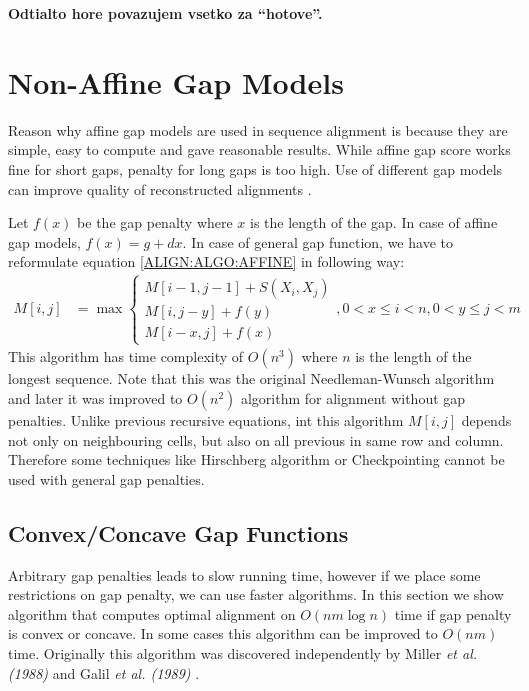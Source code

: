 \bigskip
{\large\bf Odtialto hore povazujem vsetko za ``hotove''. }
\bigskip



\section{Non-Affine Gap Models} 

 Reason why affine gap models are
used in sequence alignment is because they are simple, easy to compute and gave
reasonable results. While affine gap score works fine for short gaps, penalty
for long gaps is too high. Use of different gap models can improve quality of
reconstructed alignments \cite{Gill2004,Cartwright2009}.

Let $f(x)$ be the gap penalty where $x$ is the length of the gap. In case of
affine gap models, $f(x)=g+dx$. In case of general gap function, we have to
reformulate equation \ref{ALIGN:ALGO:AFFINE} in following way:
\begin{align}
M[i,j] &= \max
\begin{cases}
 M[i-1,j-1]+S(X_i,X_j)\\
 M[i,j-y]+f(y)\\
 M[i-x,j]+f(x)
\end{cases}, 0<x\leq i<n,0<y\leq j<m\label{ALIGN:ARBITRARYGAPEQUATION}
\end{align}
This algorithm has time complexity of $O(n^3)$ where $n$ is the length of the
longest sequence. Note that this was the original Needleman-Wunsch 
algorithm \cite{Needleman1970} and later it was improved to $O(n^2)$ algorithm
\cite{Sankoff1972} for alignment without gap penalties.
Unlike previous recursive equations, int this algorithm $M[i,j]$ depends not
only on neighbouring cells, but also on all previous in same row and column.
Therefore some techniques like Hirschberg algorithm or Checkpointing cannot be
used with general gap penalties.

\subsection{Convex/Concave Gap Functions}\label{SECTION:CONVEX}

Arbitrary gap penalties leads to slow running time, however if we place some
restrictions on gap penalty, we can use faster algorithms. In this section we
show algorithm that computes optimal alignment on $O(nm\log n)$ time if gap
penalty is convex or concave. In some cases this algorithm can be improved to
$O(nm)$ time. Originally this algorithm was discovered independently by Miller
{\it et al. (1988)} and Galil {\it et al. (1989)} \nocite{Miller1988,Galil1989}.

